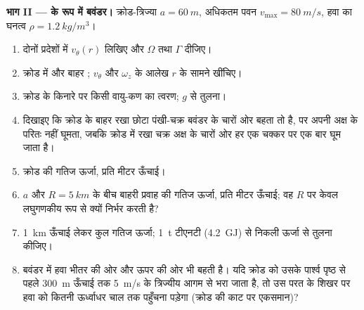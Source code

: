 \begin{problem}
\medskip
\noindent\textbf{भाग II ---  के रूप में बवंडर।}
क्रोड-त्रिज्या $a = \qty{60}{m}$, अधिकतम पवन $v_{\max} = \qty{80}{m/s}$, हवा का
घनत्व $\rho = \qty{1.2}{kg/m^3}$।
\begin{enumerate}[resume]
  \item दोनों प्रदेशों में $v_\theta(r)$ लिखिए और $\Omega$ तथा $\Gamma$ दीजिए।
  \item क्रोड में और बाहर ; $v_\theta$ और $\omega_z$ के आलेख
        $r$ के सामने खींचिए।
  \item क्रोड के किनारे पर किसी वायु-कण का त्वरण;
        $g$ से तुलना।
  \item दिखाइए कि क्रोड के बाहर रखा छोटा पंखी-चक्र बवंडर के चारों ओर
        बहता तो है, पर अपनी अक्ष के परितः नहीं घूमता, जबकि
        क्रोड में रखा चक्र अक्ष के चारों ओर हर एक चक्कर पर एक बार
        घूम जाता है।
  \item क्रोड की गतिज ऊर्जा, प्रति मीटर ऊँचाई।
  \item $a$ और $R = \qty{5}{km}$ के बीच बाहरी प्रवाह की गतिज ऊर्जा,
        प्रति मीटर ऊँचाई; वह $R$ पर केवल
        लघुगणकीय रूप से क्यों निर्भर करती है?
  \item \qty{1}{km} ऊँचाई लेकर कुल गतिज ऊर्जा; \qty{1}{t} टीएनटी
        (\qty{4.2}{GJ}) से निकली ऊर्जा से तुलना कीजिए।
  \item बवंडर में हवा भीतर की ओर और ऊपर की ओर भी बहती है। यदि क्रोड
        को उसके पार्श्व पृष्ठ से पहले \qty{300}{m} ऊँचाई तक
        \qty{5}{m/s} के त्रिज्यीय आगम से भरा जाता है, तो उस परत के शिखर पर
        हवा को कितनी ऊर्ध्वाधर चाल तक पहुँचना पड़ेगा (क्रोड की काट पर
        एकसमान)?
\end{enumerate}


\end{problem}

